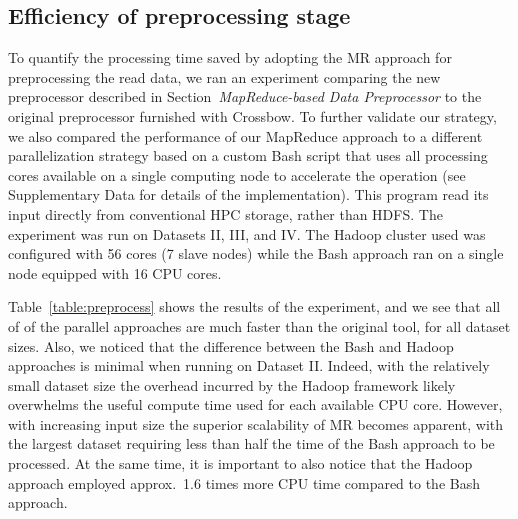 \documentclass{bioinfo}
\begin{document}
\subsection*{Efficiency of preprocessing stage}

To quantify the processing time saved by adopting the MR approach for
preprocessing the read data, we ran an
experiment comparing the new preprocessor described in
Section~{\it MapReduce-based Data Preprocessor} to the original preprocessor furnished with
Crossbow. To further validate our strategy, we also compared the performance of
our MapReduce approach to a different parallelization strategy based on a custom Bash script
that uses all processing cores available on a single computing node to accelerate the operation (see Supplementary Data for details of the implementation). This program read its
input directly from conventional HPC storage, rather than HDFS\@.  The experiment
was run on Datasets II, III, and IV\@.  The Hadoop cluster used was configured
with 56 cores (7 slave nodes) while the Bash approach ran on a single node
equipped with 16 CPU cores.



Table~\ref{table:preprocess} shows the results of the experiment, and we see that all 
of of the parallel approaches are much faster than the original tool, for
all dataset sizes.  Also, we noticed that the difference between the Bash and Hadoop
approaches is minimal when running on Dataset II\@.  Indeed, with the relatively
small dataset size the overhead incurred by the Hadoop framework likely
overwhelms the useful compute time used for each available CPU core. However,
with increasing input size the superior scalability of MR becomes apparent, with
the largest dataset requiring less than half the time of the Bash
approach to be processed. At the same time, it is important to also notice that
the Hadoop approach employed approx.\ 1.6 times more CPU time compared to the
Bash approach.
\end{document}
